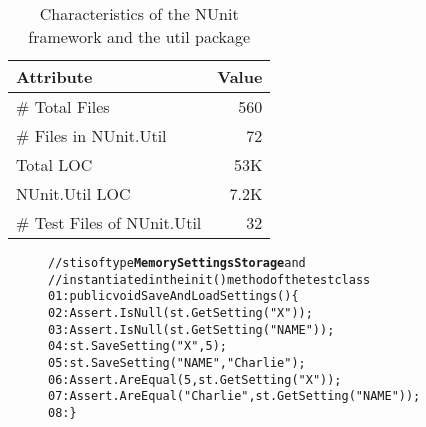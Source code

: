 \setlength{\tabcolsep}{3pt}
\begin{table}[t]
\begin{center}
\centering
\begin{tabular}{|l|r|}
\hline
\textbf{Attribute} & \textbf{Value} \\
\hline
\# Total Files & 560\\
\hline
\# Files in NUnit.Util & 72\\
\hline
Total LOC & 53K\\
\hline
NUnit.Util LOC & 7.2K\\
\hline
\# Test Files of NUnit.Util & 32\\
\hline
\end{tabular}
\end{center}
\caption{Characteristics of the NUnit framework and the util package\label{tab:utilmetrics}}
\end{table}

\begin{figure}[t]
\begin{CodeOut}
\begin{alltt}
//st is of type \textbf{MemorySettingsStorage} and 
//instantiated in the init() method of the test class
01:public void SaveAndLoadSettings() \{
02:\hspace*{0.1in}Assert.IsNull(st.GetSetting("X"));
03:\hspace*{0.1in}Assert.IsNull(st.GetSetting("NAME"));
04:\hspace*{0.1in}st.SaveSetting("X", 5);
05:\hspace*{0.1in}st.SaveSetting("NAME", "Charlie");
06:\hspace*{0.1in}Assert.AreEqual(5, st.GetSetting("X"));
07:\hspace*{0.1in}Assert.AreEqual("Charlie", st.GetSetting("NAME"));
08:\}
\end{alltt}
\end{CodeOut}
\end{figure}

